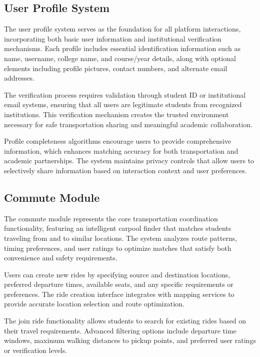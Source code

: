 \documentclass[conference]{IEEEtran}
\begin{document}
\subsection{User Profile System}

The user profile system serves as the foundation for all platform interactions, incorporating both basic user information and institutional verification mechanisms. Each profile includes essential identification information such as name, username, college name, and course/year details, along with optional elements including profile pictures, contact numbers, and alternate email addresses.

The verification process requires validation through student ID or institutional email systems, ensuring that all users are legitimate students from recognized institutions. This verification mechanism creates the trusted environment necessary for safe transportation sharing and meaningful academic collaboration.

Profile completeness algorithms encourage users to provide comprehensive information, which enhances matching accuracy for both transportation and academic partnerships. The system maintains privacy controls that allow users to selectively share information based on interaction context and user preferences.

\subsection{Commute Module}

The commute module represents the core transportation coordination functionality, featuring an intelligent carpool finder that matches students traveling from and to similar locations. The system analyzes route patterns, timing preferences, and user ratings to optimize matches that satisfy both convenience and safety requirements.

Users can create new rides by specifying source and destination locations, preferred departure times, available seats, and any specific requirements or preferences. The ride creation interface integrates with mapping services to provide accurate location selection and route optimization.

The join ride functionality allows students to search for existing rides based on their travel requirements. Advanced filtering options include departure time windows, maximum walking distances to pickup points, and preferred user ratings or verification levels.
\end{document}
